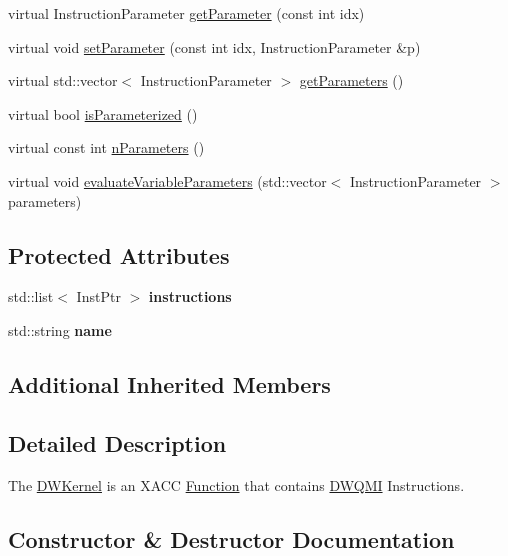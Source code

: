 \begin{DoxyCompactItemize}
\item 
virtual Instruction\+Parameter \hyperlink{a00032_a81711b7db284aba35d6952e4d1d15d41}{get\+Parameter} (const int idx)
\item 
virtual void \hyperlink{a00032_adf89cdd1f54e183c4cff36b338b2be8d}{set\+Parameter} (const int idx, Instruction\+Parameter \&p)
\item 
virtual std\+::vector$<$ Instruction\+Parameter $>$ \hyperlink{a00032_a829462cff34e2257da06afd8a2051a8e}{get\+Parameters} ()
\item 
virtual bool \hyperlink{a00032_a8957ea368244ed4a4ebd85f6bfecb785}{is\+Parameterized} ()
\item 
virtual const int \hyperlink{a00032_a029429948329b94c1d89f32cf5c486d4}{n\+Parameters} ()
\item 
virtual void \hyperlink{a00032_a09ffac417d4ecbbd82d7a680ad8dfcce}{evaluate\+Variable\+Parameters} (std\+::vector$<$ Instruction\+Parameter $>$ parameters)
\end{DoxyCompactItemize}
\subsection*{Protected Attributes}
\begin{DoxyCompactItemize}
\item 
std\+::list$<$ Inst\+Ptr $>$ {\bfseries instructions}\hypertarget{a00032_a38e434be6ef46a1ff43744632ae59ea8}{}\label{a00032_a38e434be6ef46a1ff43744632ae59ea8}

\item 
std\+::string {\bfseries name}\hypertarget{a00032_a0df03f85cc3b8a4cd1a7fc839d4d303c}{}\label{a00032_a0df03f85cc3b8a4cd1a7fc839d4d303c}

\end{DoxyCompactItemize}
\subsection*{Additional Inherited Members}


\subsection{Detailed Description}
The \hyperlink{a00032}{D\+W\+Kernel} is an X\+A\+CC \hyperlink{a00038}{Function} that contains \hyperlink{a00033}{D\+W\+Q\+MI} Instructions. 

\subsection{Constructor \& Destructor Documentation}
